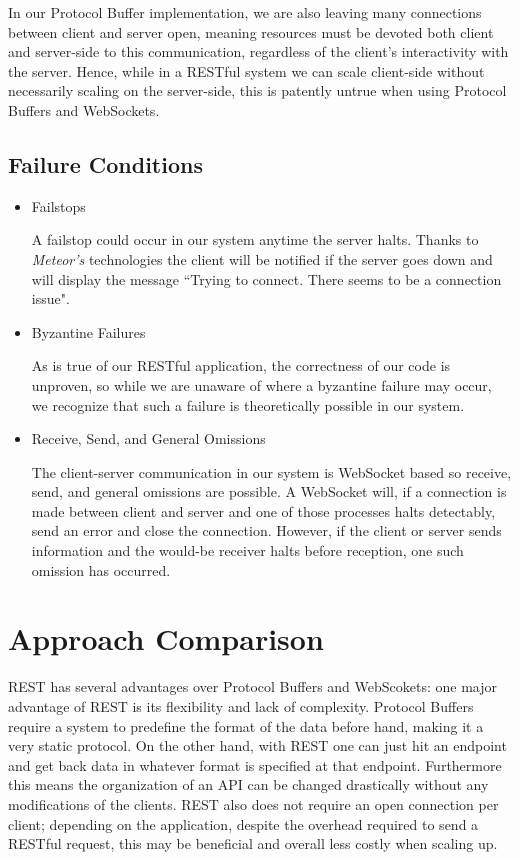 \documentclass[11pt]{article} %
\begin{document}
In our Protocol Buffer implementation, we are also leaving many connections between client and server open, meaning resources must be devoted both client and server-side to this communication, regardless of the client's interactivity with the server. Hence, while in a RESTful system we can scale client-side without necessarily scaling on the server-side, this is patently untrue when using Protocol Buffers and WebSockets. 

\subsection{Failure Conditions}

\begin{itemize}
	\item Failstops
	
	A failstop could occur in our system anytime the server halts. Thanks to \textit{Meteor's} technologies the client will be notified if the server goes down and will display the message ``Trying to connect. There seems to be a connection issue".
	
	\item Byzantine Failures
	
	As is true of our RESTful application, the correctness of our code is unproven, so while we are unaware of where a byzantine failure may occur, we recognize that such a failure is theoretically possible in our system.
	
	\item Receive, Send, and General Omissions
	
	The client-server communication in our system is WebSocket based so receive, send, and general omissions are possible. A WebSocket will, if a connection is made between client and server and one of those processes halts detectably, send an error and close the connection. However, if the client or server sends information and the would-be receiver halts before reception, one such omission has occurred. 
	
\end{itemize}	


\section{Approach Comparison} 

REST has several advantages over Protocol Buffers and WebScokets: one major advantage of REST is its flexibility and lack of complexity. Protocol Buffers require a system to predefine the format of the data before hand, making it a very static protocol. On the other hand, with REST one can just hit an endpoint and get back data in whatever format is specified at that endpoint. Furthermore this means the organization of an API can be changed drastically without any modifications of the clients. REST also does not require an open connection per client; depending on the application, despite the overhead required to send a RESTful request, this may be beneficial and overall less costly when scaling up. 
\end{document}
